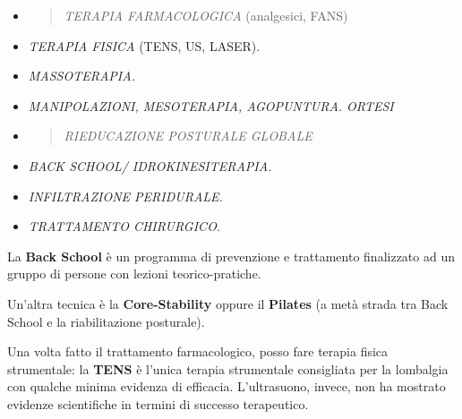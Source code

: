 \documentclass[]{article}
\begin{document}
\begin{itemize}
\item
  \begin{quote}
  \emph{TERAPIA FARMACOLOGICA} (analgesici, FANS)
  \end{quote}
\end{itemize}

\begin{itemize}
\item
  \emph{TERAPIA FISICA} (TENS, US, LASER).
\end{itemize}

\begin{itemize}
\item
  \emph{MASSOTERAPIA. }
\end{itemize}

\begin{itemize}
\item
  \emph{MANIPOLAZIONI, MESOTERAPIA, AGOPUNTURA. ORTESI}
\end{itemize}

\begin{itemize}
\item
  \begin{quote}
  \emph{RIEDUCAZIONE POSTURALE GLOBALE}
  \end{quote}
\end{itemize}

\begin{itemize}
\item
  \emph{BACK SCHOOL/ IDROKINESITERAPIA. }
\item
  \emph{INFILTRAZIONE PERIDURALE. }
\end{itemize}

\begin{itemize}
\item
  \emph{TRATTAMENTO CHIRURGICO. }
\end{itemize}

La \textbf{Back School} è un programma di prevenzione e trattamento
finalizzato ad un gruppo di persone con lezioni teorico-pratiche.

Un'altra tecnica è la \textbf{Core-Stability} oppure il \textbf{Pilates}
(a metà strada tra Back School e la riabilitazione posturale).

Una volta fatto il trattamento farmacologico, posso fare terapia fisica
strumentale: la \textbf{TENS} è l'unica terapia strumentale consigliata
per la lombalgia con qualche minima evidenza di efficacia. L'ultrasuono,
invece, non ha mostrato evidenze scientifiche in termini di successo
terapeutico.
\end{document}

